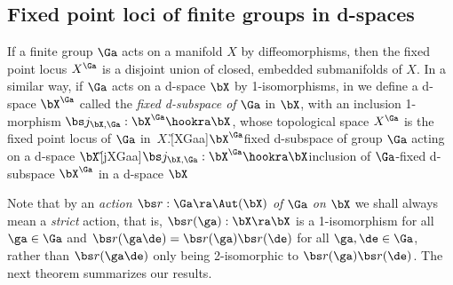 \documentclass{article}
\begin{document}
\subsection{Fixed point loci of finite groups in d-spaces}
\label{ds34}

If a finite group $\Ga$ acts on a manifold $X$ by diffeomorphisms,
then the fixed point locus $X^\Ga$ is a disjoint union of closed,
embedded submanifolds of $X$. In a similar way, if $\Ga$ acts on a
d-space $\bX$ by 1-isomorphisms, in \cite[\S 2.7]{Joyc6} we define a
d-space $\bX^\Ga$ called the {\it fixed d-subspace of\/} $\Ga$ in
$\bX$, with an inclusion 1-morphism $\bs
j_{\bX,\Ga}:\bX^\Ga\hookra\bX$, whose topological space $X^\Ga$ is
the fixed point locus of $\Ga$ in~$X$.\G[XGaa]{$\bX^\Ga$}{fixed
d-subspace of group $\Ga$ acting on a d-space $\bX$}\G[jXGaa]{$\bs
j_{\bX,\Ga}:\bX^\Ga\hookra \bX$}{inclusion of $\Ga$-fixed d-subspace
$\bX^\Ga$ in a d-space $\bX$}

Note that by an {\it action\/ $\bs r:\Ga\ra\Aut(\bX)$ of\/ $\Ga$
on\/} $\bX$ we shall always mean a {\it strict\/} action, that is,
$\bs r(\ga):\bX\ra\bX$ is a 1-isomorphism for all $\ga\in\Ga$ and
$\bs r(\ga\de)=\bs r(\ga)\bs r(\de)$ for all $\ga,\de\in\Ga$, rather
than $\bs r(\ga\de)$ only being 2-isomorphic to $\bs r(\ga)\bs
r(\de)$. The next theorem summarizes our results.
\end{document}

